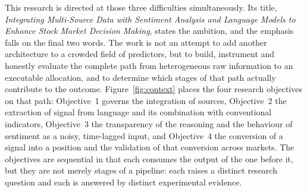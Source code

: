 This research is directed at those three difficulties simultaneously. Its title,
\emph{Integrating Multi-Source Data with Sentiment Analysis and Language Models to Enhance
Stock Market Decision Making}, states the ambition, and the emphasis falls on the final two
words. The work is not an attempt to add another architecture to a crowded field of predictors,
but to build, instrument and honestly evaluate the complete path from heterogeneous raw
information to an executable allocation, and to determine which stages of that path actually
contribute to the outcome. Figure~\ref{fig:context} places the four research objectives on that
path: Objective~1 governs the integration of sources, Objective~2 the extraction of signal from
language and its combination with conventional indicators, Objective~3 the transparency of the
reasoning and the behaviour of sentiment as a noisy, time-lagged input, and Objective~4 the
conversion of a signal into a position and the validation of that conversion across markets.
The objectives are sequential in that each consumes the output of the one before it, but they
are not merely stages of a pipeline: each raises a distinct research question and each is
answered by distinct experimental evidence.

